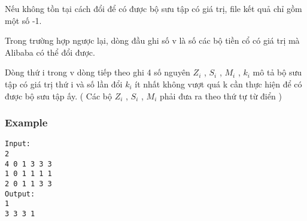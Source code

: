 Nếu không tồn tại cách đổi để có được bộ sưu tập có giá trị, file kết quả chỉ gồm một số -1.

Trong trường hợp ngược lại, dòng đầu ghi số v là số các bộ tiền cổ có giá trị mà Alibaba có thể đổi được.

Dòng thứ i trong v dòng tiếp theo ghi 4 số nguyên $Z_{i}$ , $S_{i}$ , $M_{i}$ , $k_{i}$ mô tả bộ sưu tập có giá trị thứ i và số lần đổi $k_{i}$ ít nhất không vượt quá k cần thực hiện để có được bộ sưu tập ấy. ( Các bộ $Z_{i}$ , $S_{i}$ , $M_{i}$ phải đưa ra theo thứ tự từ điển )

\subsubsection{Example}
\begin{verbatim}
Input:
2
4 0 1 3 3 3
1 0 1 1 1 1
2 0 1 1 3 3
Output:
1
3 3 3 1
\end{verbatim}
